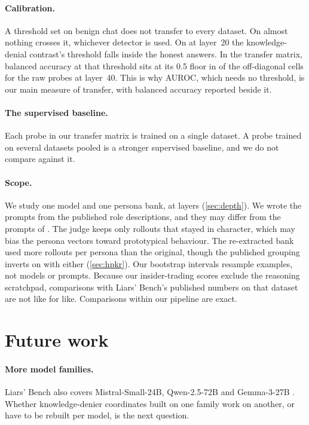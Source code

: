\paragraph{Calibration.} A threshold set on benign chat does not transfer to every dataset. On
\hpc{} almost nothing crosses it, whichever detector is used. On \hpkr{} at layer~20 the
knowledge-denial contrast's threshold falls inside the honest answers. In the transfer matrix,
balanced accuracy at that threshold sits at its 0.5 floor in  of the
 off-diagonal cells for the raw probes at layer~40. This is why AUROC, which
needs no threshold, is our main measure of transfer, with balanced accuracy reported beside it.

\paragraph{The supervised baseline.} Each probe in our transfer matrix is trained on a single
dataset. A probe trained on several datasets pooled is a stronger supervised baseline, and we do
not compare against it.

\paragraph{Scope.} We study one model and one persona bank, at  layers
(\cref{sec:depth}). We wrote the prompts from
the published role descriptions, and they may differ from the prompts of
\citet{mahadik2026persona}. The judge keeps only rollouts that stayed in character, which may bias
the persona vectors toward prototypical behaviour. The re-extracted bank used more rollouts per
persona than the original, though the published grouping inverts on \hpkr{} with either
(\cref{sec:hpkr}). Our bootstrap intervals resample examples, not models or prompts. Because our
insider-trading scores exclude the reasoning scratchpad, comparisons with Liars' Bench's published
numbers on that dataset are not like for like. Comparisons within our pipeline are exact.

\section{Future work}
\label{sec:future}

\paragraph{More model families.} Liars' Bench also covers Mistral-Small-24B, Qwen-2.5-72B and
Gemma-3-27B \citep{kretschmar2025liars}. Whether knowledge-denier coordinates built on one family
work on another, or have to be rebuilt per model, is the next question.


